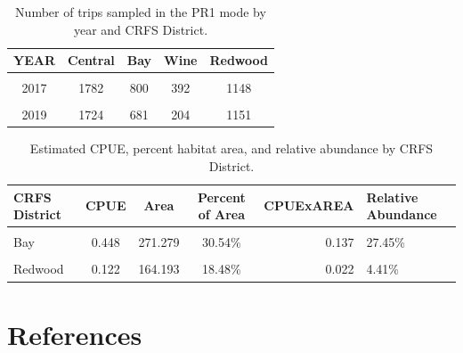 \documentclass[
  english,
  a4paper,
]{article}
\begin{document}
\begin{table}

\caption{\label{tab:number-trips}Number of trips sampled in the PR1 mode by year and CRFS District.}
\centering
\begin{tabular}[t]{ccccc}
\toprule
YEAR & Central & Bay & Wine & Redwood\\
\midrule
\cellcolor{gray!6}{2016} & \cellcolor{gray!6}{2175} & \cellcolor{gray!6}{795} & \cellcolor{gray!6}{279} & \cellcolor{gray!6}{1108}\\
2017 & 1782 & 800 & 392 & 1148\\
\cellcolor{gray!6}{2018} & \cellcolor{gray!6}{1783} & \cellcolor{gray!6}{677} & \cellcolor{gray!6}{345} & \cellcolor{gray!6}{1149}\\
2019 & 1724 & 681 & 204 & 1151\\
\bottomrule
\end{tabular}
\end{table}

\begin{table}

\caption{\label{tab:rel-cpue}Estimated CPUE, percent habitat area, and relative abundance by CRFS District.}
\centering
\begin{tabular}[t]{lcccrl}
\toprule
CRFS District & CPUE & Area & Percent of Area & CPUExAREA & Relative Abundance\\
\midrule
\cellcolor{gray!6}{Central} & \cellcolor{gray!6}{0.833} & \cellcolor{gray!6}{315.912} & \cellcolor{gray!6}{35.56\%} & \cellcolor{gray!6}{0.296} & \cellcolor{gray!6}{59.32\%}\\
Bay & 0.448 & 271.279 & 30.54\% & 0.137 & 27.45\%\\
\cellcolor{gray!6}{Wine} & \cellcolor{gray!6}{0.286} & \cellcolor{gray!6}{136.937} & \cellcolor{gray!6}{15.42\%} & \cellcolor{gray!6}{0.044} & \cellcolor{gray!6}{8.82\%}\\
Redwood & 0.122 & 164.193 & 18.48\% & 0.022 & 4.41\%\\
\bottomrule
\end{tabular}
\end{table}

\clearpage

\hypertarget{references}{%
\section{References}\label{references}}
\end{document}
